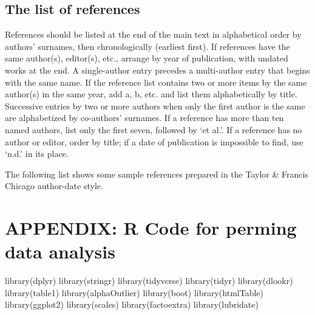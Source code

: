\documentclass[]{interact}
\theoremstyle{plain}%
\theoremstyle{definition}
\theoremstyle{remark}
\newenvironment{Shaded}{\begin{snugshade}}{\end{snugshade}}
\newcommand{\FunctionTok}[1]{\textcolor[rgb]{0.00,0.00,0.00}{#1}}
\newcommand{\NormalTok}[1]{#1}
\begin{document}
\hypertarget{the-list-of-references}{%
\subsection{The list of references}\label{the-list-of-references}}

References should be listed at the end of the main text in alphabetical
order by authors' surnames, then chronologically (earliest first). If
references have the same author(s), editor(s), etc., arrange by year of
publication, with undated works at the end. A single-author entry
precedes a multi-author entry that begins with the same name. If the
reference list contains two or more items by the same author(s) in the
same year, add a, b, etc. and list them alphabetically by title.
Successive entries by two or more authors when only the first author is
the same are alphabetized by co-authors' surnames. If a reference has
more than ten named authors, list only the first seven, followed by `et
al.'. If a reference has no author or editor, order by title; if a date
of publication is impossible to find, use `n.d.' in its place.

The following list shows some sample references prepared in the Taylor
\& Francis Chicago author-date style.

\citep{Ade09, Alb05}

\hypertarget{appendix-r-code-for-perming-data-analysis}{%
\section{APPENDIX: R Code for perming data
analysis}\label{appendix-r-code-for-perming-data-analysis}}

\begin{Shaded}
\begin{Highlighting}[]
\FunctionTok{library}\NormalTok{(dplyr)}
\FunctionTok{library}\NormalTok{(stringr)}
\FunctionTok{library}\NormalTok{(tidyverse)}
\FunctionTok{library}\NormalTok{(tidyr)}
\FunctionTok{library}\NormalTok{(dlookr)}
\FunctionTok{library}\NormalTok{(table1)}
\FunctionTok{library}\NormalTok{(alphaOutlier)}
\FunctionTok{library}\NormalTok{(boot) }
\FunctionTok{library}\NormalTok{(htmlTable)}
\FunctionTok{library}\NormalTok{(ggplot2)}
\FunctionTok{library}\NormalTok{(scales)}
\FunctionTok{library}\NormalTok{(factoextra)}
\FunctionTok{library}\NormalTok{(lubridate)}
\end{Highlighting}
\end{Shaded}







\end{document}
